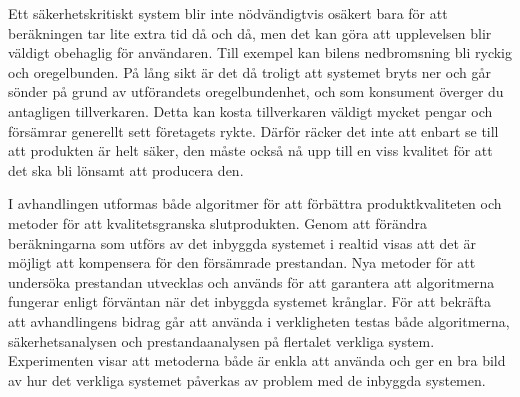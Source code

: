 \documentclass[svenska]{style/LTHthesis}
\begin{document}
Ett säkerhetskritiskt system blir inte nödvändigtvis osäkert bara för att beräkningen tar lite extra tid då och då, men det kan göra att upplevelsen blir väldigt obehaglig för användaren.
Till exempel kan bilens nedbromsning bli ryckig och oregelbunden.
På lång sikt är det då troligt att systemet bryts ner och går sönder på grund av utförandets oregelbundenhet, och som konsument överger du antagligen tillverkaren.
Detta kan kosta tillverkaren väldigt mycket pengar och försämrar generellt sett företagets rykte.
Därför räcker det inte att enbart se till att produkten är helt säker, den måste också nå upp till en viss kvalitet för att det ska bli lönsamt att producera den.

I avhandlingen utformas både algoritmer för att förbättra produktkvaliteten och metoder för att kvalitetsgranska slutprodukten.
Genom att förändra beräkningarna som utförs av det inbyggda systemet i realtid visas att det är möjligt att kompensera för den försämrade prestandan.
Nya metoder för att undersöka prestandan utvecklas och används för att garantera att algoritmerna fungerar enligt förväntan när det inbyggda systemet krånglar.
För att bekräfta att avhandlingens bidrag går att använda i verkligheten testas både algoritmerna, säkerhetsanalysen och prestandaanalysen på flertalet verkliga system.
Experimenten visar att metoderna både är enkla att använda och ger en bra bild av hur det verkliga systemet påverkas av problem med de inbyggda systemen.
\end{document}
